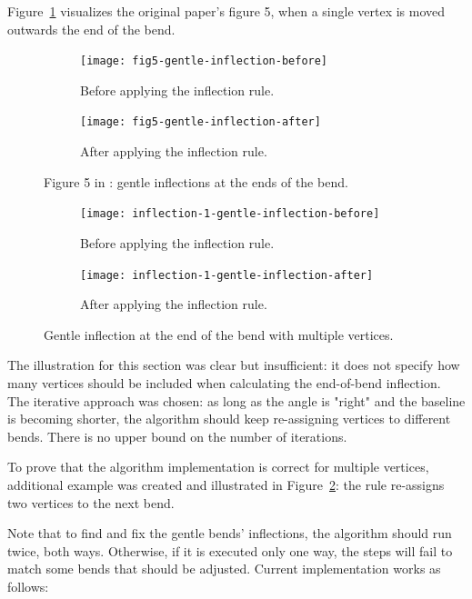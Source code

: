 \documentclass[a4paper]{article}
\begin{document}
Figure~\ref{fig:fig5-gentle-inflection} visualizes the original paper's figure 5,
when a single vertex is moved outwards the end of the bend.

\begin{figure}[ht]
    \centering
    \begin{subfigure}[b]{.49\textwidth}
        \texttt{[image: fig5-gentle-inflection-before]}
        \caption{Before applying the inflection rule.}
    \end{subfigure}
    \hfill
    \begin{subfigure}[b]{.49\textwidth}
        \texttt{[image: fig5-gentle-inflection-after]}
        \caption{After applying the inflection rule.}
    \end{subfigure}
    \caption{Figure 5 in \cite{wang1998line}: gentle inflections at the ends of
    the bend.}
    \label{fig:fig5-gentle-inflection}
\end{figure}

\begin{figure}[h!]
    \centering
    \begin{subfigure}[b]{.49\textwidth}
        \texttt{[image: inflection-1-gentle-inflection-before]}
        \caption{Before applying the inflection rule.}
    \end{subfigure}
    \hfill
    \begin{subfigure}[b]{.49\textwidth}
        \texttt{[image: inflection-1-gentle-inflection-after]}
        \caption{After applying the inflection rule.}
    \end{subfigure}
    \caption{Gentle inflection at the end of the bend with multiple vertices.}
    \label{fig:inflection-1-gentle-inflection}
\end{figure}

The illustration for this section was clear but insufficient: it does not
specify how many vertices should be included when calculating the end-of-bend
inflection. The iterative approach was chosen: as long as the angle is
"right" and the baseline is becoming shorter, the algorithm should keep
re-assigning vertices to different bends. There is no upper bound
on the number of iterations.

To prove that the algorithm implementation is correct for multiple vertices,
additional example was created and illustrated in
Figure~\ref{fig:inflection-1-gentle-inflection}: the rule re-assigns two
vertices to the next bend.

Note that to find and fix the gentle bends' inflections, the algorithm should
run twice, both ways. Otherwise, if it is executed only one way, the steps will
fail to match some bends that should be adjusted. Current implementation works
as follows:
\end{document}
